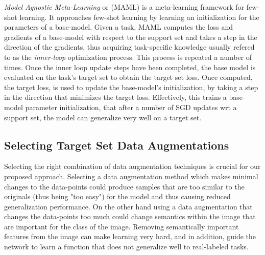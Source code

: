\documentclass{article}
\begin{document}
\emph{Model Agnostic Meta-Learning} \cite{finn2017model} or (MAML) is a meta-learning framework for few-shot learning. It approaches few-shot learning by learning an initialization for the parameters of a base-model. Given a task, MAML computes the loss and gradients of a base-model with respect to the support set and takes a step in the direction of the gradients, thus acquiring task-specific knowledge usually refered to as the \emph{inner-loop} optimization process. This process is repeated a number of times. Once the inner loop update steps have been completed, the base model is evaluated on the task's target set to obtain the target set loss. Once computed, the target loss, is used to update the base-model's initialization, by taking a step in the direction that minimizes the target loss. Effectively, this trains a base-model parameter initialization, that after a number of SGD updates wrt a support set, the model can generalize very well on a target set. 

\subsection{Selecting Target Set Data Augmentations}\label{label-free-data-augmentation}

Selecting the right combination of data augmentation techniques is crucial for our proposed approach. Selecting a data augmentation method which makes minimal changes to the data-points could produce samples that are too similar to the originals (thus being "too easy") for the model and thus causing reduced generalization performance. On the other hand using a data augmentation that changes the data-points too much could change semantics within the image that are important for the class of the image. Removing semantically important features from the image can make learning very hard, and in addition, guide the network to learn a function that does not generalize well to real-labeled tasks. 
\end{document}
